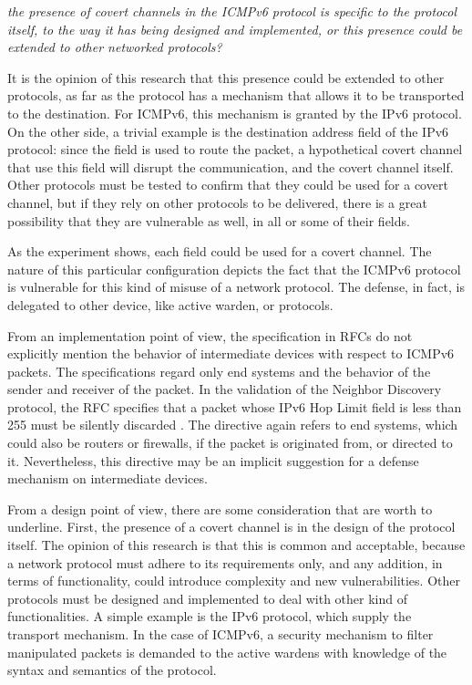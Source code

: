 \documentclass[12pt]{article}
\begin{document}
\textit{the presence of covert channels in the ICMPv6 protocol is specific to the protocol itself, to the way it has being designed and implemented, or this presence could be extended to other networked protocols?}

It is the opinion of this research that this presence could be extended to other protocols, as far as the protocol has a mechanism that allows it to be transported to the destination. For ICMPv6, this mechanism is granted by the IPv6 protocol. On the other side, a trivial example is the destination address field of the IPv6 protocol: since the field is used to route the packet, a hypothetical covert channel that use this field will disrupt the communication, and the covert channel itself. Other protocols must be tested to confirm that they could be used for a covert channel, but if they rely on other protocols to be delivered, there is a great possibility that they are vulnerable as well, in all or some of their fields.

As the experiment shows, each field could be used for a covert channel. The nature of this particular configuration depicts the fact that the ICMPv6 protocol is vulnerable for this kind of misuse of a network protocol. The defense, in fact, is delegated to other device, like active warden, or protocols.

From an implementation point of view, the specification in RFCs do not explicitly mention the behavior of intermediate devices with respect to ICMPv6 packets. The specifications regard only end systems and the behavior of the sender and receiver of the packet. In the validation of the Neighbor Discovery protocol, the RFC specifies that a packet whose IPv6 Hop Limit field is less than 255 must be silently discarded \cite{rfc4861}. The directive again refers to end systems, which could also be routers or firewalls, if the packet is originated from, or directed to it. Nevertheless, this directive may be an implicit suggestion for a defense mechanism on intermediate devices. 

From a design point of view, there are some consideration that are worth to underline. First, the presence of a covert channel is in the design of the protocol itself. The opinion of this research is that this is common and acceptable, because a network protocol must adhere to its requirements only, and any addition, in terms of functionality, could introduce complexity and new vulnerabilities. Other protocols must be designed and implemented to deal with other kind of functionalities. A simple example is the IPv6 protocol, which supply the transport mechanism. In the case of ICMPv6, a security mechanism to filter manipulated packets is demanded to the active wardens with knowledge of the syntax and semantics of the protocol.
\end{document}
